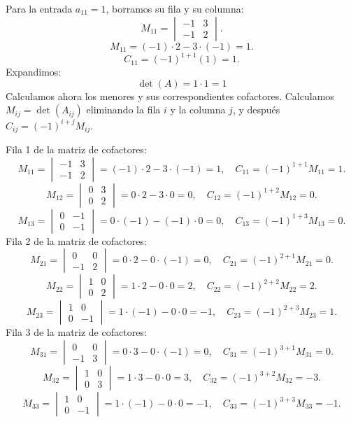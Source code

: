 \documentclass[12pt]{article}
\theoremstyle{remark}
\begin{document}
Para la entrada $a_{11}=1$, borramos su fila y su columna:
\[
M_{11}=\begin{vmatrix}-1&3\\-1&2\end{vmatrix}.
\]
\[
M_{11}=(-1)\cdot 2-3\cdot (-1)=1.
\]
\[
C_{11}=(-1)^{1+1}(1)=1.
\]
Expandimos: \[
\boxed{\det(A)=1\cdot 1=1}
\]
Calculamos ahora los menores y sus correspondientes cofactores. Calculamos $M_{ij}=\det(A_{ij})$ eliminando la fila $i$ y la columna $j$, y después $C_{ij}=(-1)^{i+j}M_{ij}$.

Fila 1 de la matriz de cofactores:
\[
M_{11}=\begin{vmatrix}-1&3\\-1&2\end{vmatrix}=(-1)\cdot 2-3\cdot (-1)=1,\quad C_{11}=(-1)^{1+1}M_{11}=1.
\]
\[
M_{12}=\begin{vmatrix}0&3\\0&2\end{vmatrix}=0\cdot 2-3\cdot 0=0,\quad C_{12}=(-1)^{1+2}M_{12}=0.
\]
\[
M_{13}=\begin{vmatrix}0&-1\\0&-1\end{vmatrix}=0\cdot (-1)-(-1)\cdot 0=0,\quad C_{13}=(-1)^{1+3}M_{13}=0.
\]
Fila 2 de la matriz de cofactores:
\[
M_{21}=\begin{vmatrix}0&0\\-1&2\end{vmatrix}=0\cdot 2-0\cdot (-1)=0,\quad C_{21}=(-1)^{2+1}M_{21}=0.
\]
\[
M_{22}=\begin{vmatrix}1&0\\0&2\end{vmatrix}=1\cdot 2-0\cdot 0=2,\quad C_{22}=(-1)^{2+2}M_{22}=2.
\]
\[
M_{23}=\begin{vmatrix}1&0\\0&-1\end{vmatrix}=1\cdot (-1)-0\cdot 0=-1,\quad C_{23}=(-1)^{2+3}M_{23}=1.
\]
Fila 3 de la matriz de cofactores:
\[
M_{31}=\begin{vmatrix}0&0\\-1&3\end{vmatrix}=0\cdot 3-0\cdot (-1)=0,\quad C_{31}=(-1)^{3+1}M_{31}=0.
\]
\[
M_{32}=\begin{vmatrix}1&0\\0&3\end{vmatrix}=1\cdot 3-0\cdot 0=3,\quad C_{32}=(-1)^{3+2}M_{32}=-3.
\]
\[
M_{33}=\begin{vmatrix}1&0\\0&-1\end{vmatrix}=1\cdot (-1)-0\cdot 0=-1,\quad C_{33}=(-1)^{3+3}M_{33}=-1.
\]
\end{document}
